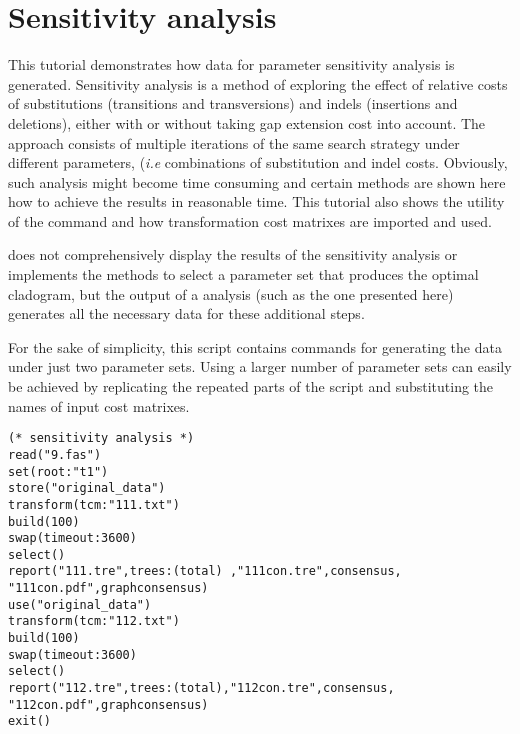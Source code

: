 \section{Sensitivity analysis}{\label{tutorial 5}}

This tutorial demonstrates how data for parameter sensitivity analysis is generated. Sensitivity analysis \cite{wheeler1995} is a method of exploring the effect of relative costs of substitutions (transitions and transversions) and indels (insertions and deletions), either with or without taking gap extension cost into account. The approach consists of multiple iterations of the same search strategy under different parameters, (\emph{i.e} combinations of substitution and indel costs. Obviously, such analysis might become time consuming and certain methods are shown here how to achieve the results in reasonable time. This tutorial also shows the utility of the command  and how transformation cost matrixes are imported and used.

\poy does not comprehensively display the results of the sensitivity analysis or implements the methods to select a parameter set that produces the optimal cladogram, but the output of a \poy analysis (such as the one presented here) generates all the necessary data for these additional steps.

For the sake of simplicity, this script contains commands for generating the data under just two parameter  sets. Using a larger number of parameter sets can easily be achieved by replicating the repeated parts of the script and substituting the names of input cost matrixes.

\begin{verbatim}
(* sensitivity analysis *)
read("9.fas")
set(root:"t1")
store("original_data")
transform(tcm:"111.txt")
build(100)
swap(timeout:3600)
select()
report("111.tre",trees:(total) ,"111con.tre",consensus,
"111con.pdf",graphconsensus)
use("original_data")
transform(tcm:"112.txt")
build(100)
swap(timeout:3600)
select()
report("112.tre",trees:(total),"112con.tre",consensus,
"112con.pdf",graphconsensus)
exit()
\end{verbatim}

